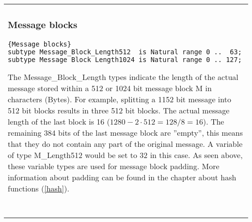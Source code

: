 
\begin{tabular}{p{\textwidth}}
\subsubsection{Message blocks} 
\begin{lstlisting}{Message blocks}
subtype Message_Block_Length512  is Natural range 0 ..  63;
subtype Message_Block_Length1024 is Natural range 0 .. 127;

\end{lstlisting}
The Message\_Block\_Length types indicate the length of the actual message
stored within a 512 or 1024 bit message block M in characters (Bytes).
For example, splitting a 1152 bit message into 512 bit blocks results in
three 512 bit blocks. The actual message length of the last block is 16 
($1280 - 2 \cdot 512 = 128 / 8 = 16$).
The remaining 384 bits of the last message block are ''empty'', 
this means that they do not contain any part of the original message.
A variable of type M\_Length512 would be set to 32 in this case.
As seen above, these variable types are used for message block padding.
More information about padding can be found in the chapter about hash
functions (\ref{hash}).\\ \ \\
\hline 
\end{tabular}\ \\



